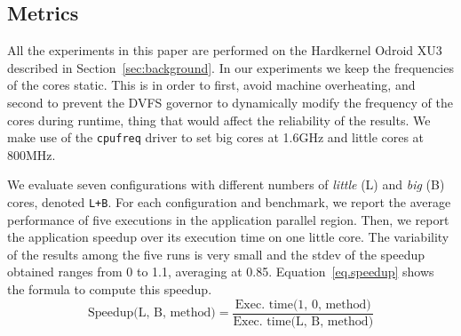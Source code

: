 \subsection{Metrics}
\label{sec:metrics}

All the experiments in this paper are performed on the Hardkernel Odroid XU3 described in Section~\ref{sec:background}. 
In our experiments we keep the frequencies of the cores static.
This is in order to first, avoid machine overheating, and second to prevent the DVFS governor to dynamically modify the frequency of the cores during runtime, thing that would affect the reliability of the results.
We make use of the \texttt{cpufreq} driver to set big cores at 1.6GHz and little cores at 800MHz. 


We evaluate seven configurations with different numbers of \textit{little} (L) and \textit{big} (B) cores, denoted \texttt{L+B}.
For each configuration and benchmark, we report the average performance of five executions in the application parallel region. Then, we report the application speedup over its execution time on one little core.
The variability of the results among the five runs is very small and the stdev of the speedup obtained ranges from 0 to 1.1, averaging at 0.85.
Equation~\ref{eq.speedup} shows the formula to compute this speedup.
\begingroup\makeatletter\def\f@size{9}\check@mathfonts
\begin{equation}
  \text{Speedup(L, B, method)} = \frac{\text{Exec. time(1, 0, method)}}{\text{Exec. time(L, B, 
method)}}
\label{eq.speedup}
\end{equation}
\endgroup


